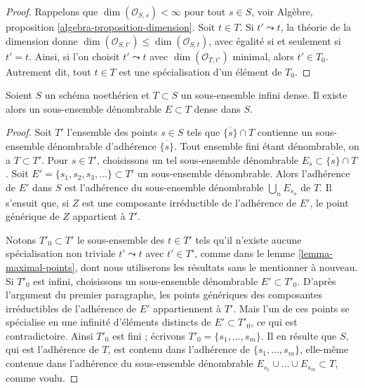 \begin{proof}
Rappelons que $\dim(\mathcal{O}_{S, s}) < \infty$ pour tout $s \in S$,
voir Algèbre, proposition \ref{algebra-proposition-dimension}. Soit $t \in T$.
Si $t' \leadsto t$, la théorie de la dimension donne
$\dim(\mathcal{O}_{S, t'}) \leq \dim(\mathcal{O}_{S, t})$,
avec égalité si et seulement si $t' = t$. Ainsi, si l'on choisit $t' \leadsto t$
avec $\dim(\mathcal{O}_{T, t'})$ minimal, alors $t' \in T_0$.
Autrement dit, 
tout $t \in T$ est une spécialisation d'un élément de $T_0$.
\end{proof}

\begin{lemma}
\label{lemma-countable-dense-subset}
Soient $S$ un schéma noethérien et $T \subset S$ un sous-ensemble infini dense. Il
existe alors un sous-ensemble dénombrable $E \subset T$ dense dans $S$.
\end{lemma}

\begin{proof}
Soit $T'$ l'ensemble des points $s \in S$ tels que $\overline{\{s\}} \cap T$
contienne un sous-ensemble dénombrable d'adhérence $\overline{\{s\}}$.
Tout ensemble fini étant dénombrable, on a $T \subset T'$.
Pour $s \in T'$, choisissons un tel sous-ensemble dénombrable
$E_s \subset \overline{\{s\}} \cap T$.
Soit $E' = \{s_1, s_2, s_3, \ldots\} \subset T'$
un sous-ensemble dénombrable. Alors l'adhérence de $E'$ dans $S$ est
l'adhérence du sous-ensemble dénombrable $\bigcup_n E_{s_n}$ de $T$.
Il s'ensuit que, si $Z$
est une composante irréductible de l'adhérence de $E'$, le point
générique de $Z$ appartient à $T'$.

\medskip\noindent
Notons $T'_0 \subset T'$ le sous-ensemble des $t \in T'$ tels qu'il
n'existe aucune spécialisation non triviale $t' \leadsto t$ avec $t' \in T'$,
comme dans le lemme \ref{lemma-maximal-points}, dont nous utiliserons les
résultats sans le mentionner à nouveau. Si $T'_0$ est infini, choisissons un
sous-ensemble dénombrable $E' \subset T'_0$. D'après l'argument du premier
paragraphe, les points génériques des composantes irréductibles de
l'adhérence de $E'$ appartiennent à $T'$. Mais l'un de ces points se spécialise en une
infinité d'éléments distincts de $E' \subset T'_0$,
ce qui est contradictoire. Ainsi $T'_0$ est fini ; écrivons
$T'_0 = \{s_1, \ldots, s_m\}$. Il en résulte que $S$, qui est
l'adhérence de $T$, est contenu dans l'adhérence de
$\{s_1, \ldots, s_m\}$, elle-même contenue dans l'adhérence du
sous-ensemble dénombrable $E_{s_1} \cup \ldots \cup E_{s_m} \subset T$,
comme voulu.
\end{proof}








